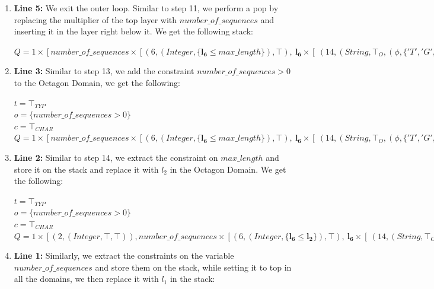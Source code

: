 \documentclass[10pt]{report}
\begin{document}
\begin{enumerate}
	\item \textbf{Line 5:} We exit the outer loop. Similar to step 11, we perform a pop by replacing the multiplier of the top layer with $ number\_of\_sequences $ and inserting it in the layer right below it. We get the following stack: 
	\begin{center}
		$ Q = 1 \times [ number\_of\_sequences \times [(6, (Integer, \lbrace \mathbf{l_{6}} \leq max\_length \rbrace ), \top), \ \mathbf{l_{6}} \times [\ (14, (String, \top_{O}, (\phi, \lbrace'T', 'G', 'C', 'A' \rbrace) \rbrace))], (25, (String, \top_{O}, (\phi, \lbrace '\#', '.' \rbrace)))]] $
	\end{center}
	\item \textbf{Line 3:} Similar to step 13, we add the constraint $ number\_of\_sequences > 0$ to the Octagon Domain, we get the following:
	\begin{center}
		$ t = \top_{TYP} $ \\
		$ o = \lbrace number\_of\_sequences > 0 \rbrace $\\
		$ c = \top_{CHAR} $ \\
		$ Q = 1 \times [ number\_of\_sequences \times [(6, (Integer, \lbrace \mathbf{l_{6}} \leq max\_length \rbrace ), \top), \ \mathbf{l_{6}} \times [\ (14, (String, \top_{O}, (\phi, \lbrace'T', 'G', 'C', 'A' \rbrace) \rbrace))], (25, (String, \top_{O}, (\phi, \lbrace '\#', '.' \rbrace)))]] $
		
	\end{center}
	\item \textbf{Line 2:} Similar to step 14, we extract the constraint on $ max\_length $ and store it on the stack and replace it with $ l_{2} $ in the Octagon Domain. We get the following:
	\begin{center}
		$ t = \top_{TYP} $ \\
		$ o = \lbrace number\_of\_sequences > 0 \rbrace $\\
		$ c = \top_{CHAR} $ \\
		$ Q = 1 \times [ (2, (Integer, \top, \top)), number\_of\_sequences \times [(6, (Integer, \lbrace \mathbf{l_{6}} \leq \mathbf{l_{2}} \rbrace ), \top), \ \mathbf{l_{6}} \times [\ (14, (String, \top_{O}, (\phi, \lbrace'T', 'G', 'C', 'A' \rbrace) \rbrace))], (25, (String, \top_{O}, (\phi, \lbrace '\#', '.' \rbrace)))]] $
	\end{center}
	\item \textbf{Line 1:} Similarly, we extract the constraints on the variable $ number\_of\_sequences$ and store them on the stack, while setting it to top in all the domains, we then replace it with $ l_{1} $ in the stack:
	

\end{enumerate}
\end{document}
